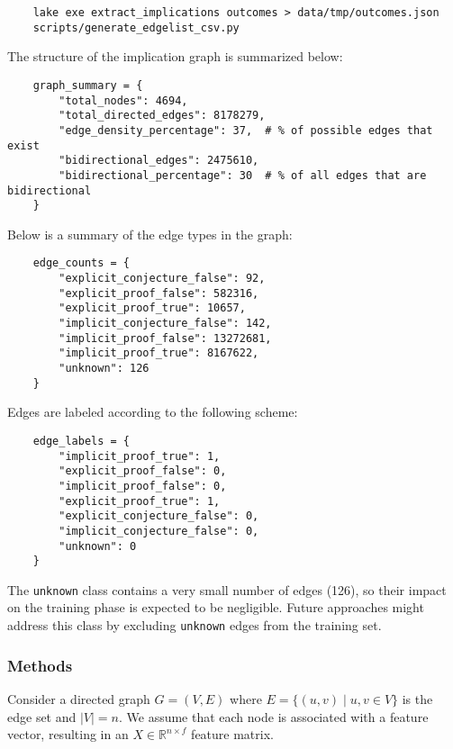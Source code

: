 \begin{verbatim}
    lake exe extract_implications outcomes > data/tmp/outcomes.json
    scripts/generate_edgelist_csv.py
\end{verbatim}

The structure of the implication graph is summarized below:

\begin{verbatim}
    graph_summary = {
        "total_nodes": 4694,
        "total_directed_edges": 8178279,
        "edge_density_percentage": 37,  # % of possible edges that exist
        "bidirectional_edges": 2475610,
        "bidirectional_percentage": 30  # % of all edges that are bidirectional
    }
\end{verbatim}

Below is a summary of the edge types in the graph:

\begin{verbatim}
    edge_counts = {
        "explicit_conjecture_false": 92,
        "explicit_proof_false": 582316,
        "explicit_proof_true": 10657,
        "implicit_conjecture_false": 142,
        "implicit_proof_false": 13272681,
        "implicit_proof_true": 8167622,
        "unknown": 126
    }
\end{verbatim}

Edges are labeled according to the following scheme:

\begin{verbatim}
    edge_labels = {
        "implicit_proof_true": 1,
        "explicit_proof_false": 0,
        "implicit_proof_false": 0,
        "explicit_proof_true": 1,
        "explicit_conjecture_false": 0,
        "implicit_conjecture_false": 0,
        "unknown": 0
    }
\end{verbatim}

The \texttt{unknown} class contains a very small number of edges (126), so their impact on the
training phase is expected to be negligible. Future approaches might address this class by
excluding \texttt{unknown} edges from the training set.

\subsubsection{Methods}

Consider a directed graph $G = (V, E)$ where $E = \{(u,v) \mid u, v \in V\}$ is the edge set and
$|V| = n$. We assume that each node is associated with a feature vector, resulting in an
$X \in \mathbb{R}^{n \times f}$ feature matrix.

